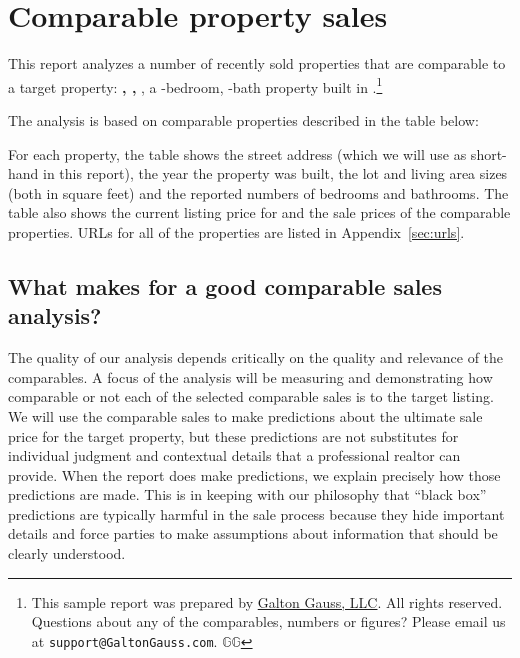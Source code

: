 \documentclass[
12pt, %
letterpaper, %
oneside, %
headinclude,footinclude, %
BCOR5mm, %
]{scrartcl}
\begin{document}


\section{Comparable property sales}
This report analyzes a number of recently sold properties that are comparable to a target property:
\textbf{\PropertyName{}, \PropertyCity{}, \PropertyState{}}, a \NumberOfBedrooms{}-bedroom, \NumberOfBaths{}-bath  \PropertyType{} property built in \PropertyYearBuilt{}.\footnote{
This sample report was prepared by \href{https://www.galtongauss.com}{Galton Gauss, LLC}.
All rights reserved.
Questions about any of the comparables, numbers or figures?
Please email us at \texttt{support@GaltonGauss.com}.
$\mathbb{G}\mathbb{G}$
}

\TypeWarning{}
The analysis is based on \NumberOfComps{} comparable properties described in the table below:

\begin{small}

\end{small}

For each property, the table shows the street address (which we will use as short-hand in this report), the year the property was built, the lot and living area sizes (both in square feet) and the reported numbers of bedrooms and bathrooms. 
The table also shows the current listing price for \PropertyName{} and the sale prices of the comparable properties.
URLs for all of the properties are listed in Appendix~\ref{sec:urls}.

\subsection{What makes for a good comparable sales analysis?}
The quality of our analysis depends critically on the quality and relevance of the comparables.
A focus of the analysis will be measuring and demonstrating how comparable or not each of the selected comparable sales is to the target listing.
We will use the comparable sales to make predictions about the ultimate sale price for the target property, but these predictions are not substitutes for individual judgment and contextual details that a professional realtor can provide.
When the report does make predictions, we explain precisely how those predictions are made.
This is in keeping with our philosophy that ``black box'' predictions are typically harmful in the sale process because they hide important details and force parties to make assumptions about information that should be clearly understood.
\end{document}
